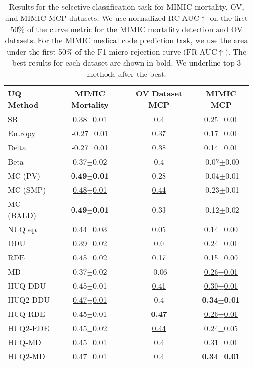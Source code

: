 \begin{table*}[t!] \centering%
\begin{tabular}{l|c|c|c}
\toprule
\textbf{UQ Method} & \textbf{MIMIC Mortality} & \textbf{OV Dataset MCP} & \textbf{MIMIC MCP} \\
\midrule
SR & 0.38$\pm$0.01 & 0.4 & 0.25$\pm$0.01 \\
Entropy & -0.27$\pm$0.01 & 0.37 & 0.17$\pm$0.01 \\
Delta & -0.27$\pm$0.01 & 0.38 & 0.14$\pm$0.01 \\
Beta & 0.37$\pm$0.02 & 0.4 & -0.07$\pm$0.00 \\\midrule
MC (PV) & \textbf{0.49$\pm$0.01} & 0.28 & -0.04$\pm$0.01 \\
MC (SMP) & \underline{0.48$\pm$0.01} & \underline{0.44} & -0.23$\pm$0.01 \\
MC (BALD) & \textbf{0.49$\pm$0.01} & 0.33 & -0.12$\pm$0.02 \\\midrule
NUQ ep. & 0.44$\pm$0.03 & 0.05 & 0.14$\pm$0.00 \\
DDU & 0.39$\pm$0.02 & 0.0 & 0.24$\pm$0.01 \\
RDE & 0.45$\pm$0.02 & 0.17 & 0.15$\pm$0.00 \\
MD & 0.37$\pm$0.02 & -0.06 & \underline{0.26$\pm$0.01} \\\midrule
HUQ-DDU & 0.45$\pm$0.01 & \underline{0.41} & \underline{0.30$\pm$0.01} \\
HUQ2-DDU & \underline{0.47$\pm$0.01} & 0.4 & \textbf{0.34$\pm$0.01} \\
HUQ-RDE & 0.45$\pm$0.01 & \textbf{0.47} & \underline{0.26$\pm$0.01} \\
HUQ2-RDE & 0.45$\pm$0.02 & \underline{0.44} & 0.24$\pm$0.05 \\
HUQ-MD & 0.45$\pm$0.01 & 0.4 & \underline{0.31$\pm$0.01} \\
HUQ2-MD & \underline{0.47$\pm$0.01} & 0.4 & \textbf{0.34$\pm$0.01} \\
\bottomrule
\end{tabular}
\caption{\label{tab:mimic_50} Results for the selective classification task for MIMIC mortality, OV, and MIMIC MCP datasets. We use normalized RC-AUC$\uparrow$ on the first 50\% of the curve metric for the MIMIC mortality detection and OV datasets. For the MIMIC medical code prediction task, we use the area under the first 50\% of the F1-micro rejection curve (FR-AUC$\uparrow$). The best results for each dataset are shown in bold. We underline top-3 methods after the best.}
\end{table*}